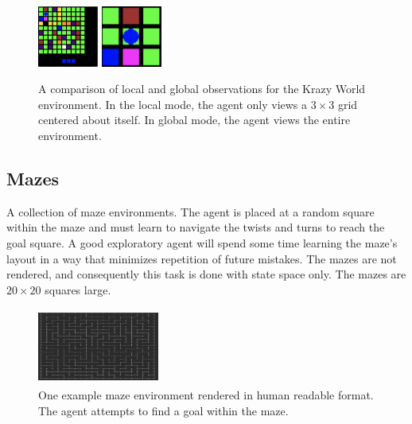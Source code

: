 \documentclass{article} %
\begin{document}
\begin{figure}[H]
\begin{center}
\includegraphics[height=20mm]{envs/grid_0.png} %
\includegraphics[height=20mm]{envs/grid_local.png}  
\end{center}
\caption{A comparison of local and global observations for the Krazy World environment. In the local mode, the agent only views a $3 \times 3$ grid centered about itself. In global mode, the agent views the entire environment.}
\end{figure} 

    
\subsection{Mazes}
A collection of maze environments. The agent is placed at a random square within the maze and must learn to navigate the twists and turns to reach the goal square. A good exploratory agent will spend some time learning the maze's layout in a way that minimizes repetition of future mistakes. The mazes are not rendered, and consequently this task is done with state space only. The mazes are $20 \times 20$ squares large.   
\begin{figure}[H]
\begin{center}
\includegraphics[width=40mm, height=25mm]{envs/maze.png} 
\end{center}
\caption{One example maze environment rendered in human readable format. The agent attempts to find a goal within the maze.}
\end{figure} 

\end{document}
